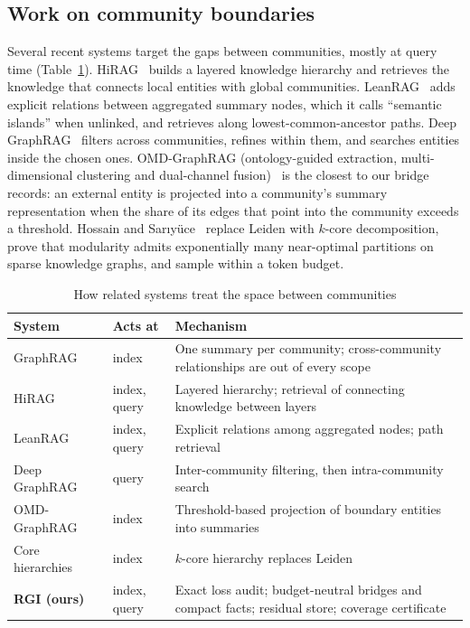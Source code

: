 \documentclass[journal]{IEEEtran}
\theoremstyle{remark}
\begin{document}
\subsection{Work on community boundaries}
Several recent systems target the gaps between communities, mostly at query time (Table~\ref{tab:related}). HiRAG~\cite{huang2025hirag} builds a layered knowledge hierarchy and retrieves the knowledge that connects local entities with global communities. LeanRAG~\cite{zhang2026leanrag} adds explicit relations between aggregated summary nodes, which it calls ``semantic islands'' when unlinked, and retrieves along lowest-common-ancestor paths. Deep GraphRAG~\cite{li2026deepgraphrag} filters across communities, refines within them, and searches entities inside the chosen ones. OMD-GraphRAG (ontology-guided extraction, multi-dimensional clustering and dual-channel fusion)~\cite{wang2026omd} is the closest to our bridge records: an external entity is projected into a community's summary representation when the share of its edges that point into the community exceeds a threshold. Hossain and Sar{\i}y{\"u}ce~\cite{hossain2026core} replace Leiden with $k$-core decomposition, prove that modularity admits exponentially many near-optimal partitions on sparse knowledge graphs, and sample within a token budget.

\begin{table}[!htbp]
\caption{How related systems treat the space between communities}\label{tab:related}
\centering\footnotesize
\begin{tabular}{@{}p{2.05cm}p{0.95cm}p{4.55cm}@{}}
\toprule
System & Acts at & Mechanism \\
\midrule
GraphRAG~\cite{edge2024graphrag} & index & One summary per community; cross-community relationships are out of every scope \\
HiRAG~\cite{huang2025hirag} & index, query & Layered hierarchy; retrieval of connecting knowledge between layers \\
LeanRAG~\cite{zhang2026leanrag} & index, query & Explicit relations among aggregated nodes; path retrieval \\
Deep GraphRAG~\cite{li2026deepgraphrag} & query & Inter-community filtering, then intra-community search \\
OMD-GraphRAG~\cite{wang2026omd} & index & Threshold-based projection of boundary entities into summaries \\
Core hierarchies~\cite{hossain2026core} & index & $k$-core hierarchy replaces Leiden \\
\textbf{RGI (ours)} & index, query & Exact loss audit; budget-neutral bridges and compact facts; residual store; coverage certificate \\
\bottomrule
\end{tabular}
\end{table}
\end{document}
